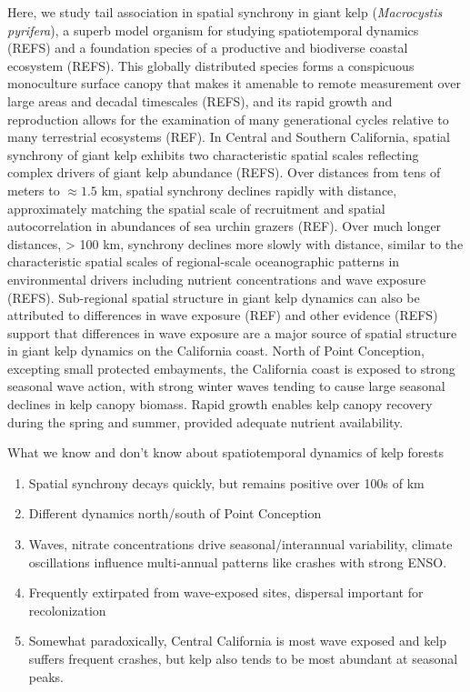 \documentclass[12pt, oneside]{article}
\begin{document}
Here, we study tail association in spatial synchrony in giant kelp (\textit{Macrocystis pyrifera}), a superb model organism for studying spatiotemporal dynamics (REFS) and a foundation species of a productive and biodiverse coastal ecosystem (REFS).
This globally distributed species forms a conspicuous monoculture surface canopy that makes it amenable to remote measurement over large areas and decadal timescales (REFS), and its rapid growth and reproduction allows for the examination of many generational cycles relative to many terrestrial ecosystems (REF). 
In Central and Southern California, spatial synchrony of giant kelp exhibits two characteristic spatial scales reflecting complex drivers of giant kelp abundance (REFS). Over distances from tens of meters to $\approx 1.5$ km, spatial synchrony declines rapidly with distance, approximately matching the spatial scale of recruitment and spatial autocorrelation in abundances of sea urchin grazers (REF). 
Over much longer distances, > 100 km, synchrony declines more slowly with distance, similar to the characteristic spatial scales of regional-scale oceanographic patterns in environmental drivers including nutrient concentrations and wave exposure (REFS).
Sub-regional spatial structure in giant kelp dynamics can also be attributed to differences in wave exposure (REF) and other evidence (REFS) support that differences in wave exposure are a major source of spatial structure in giant kelp dynamics on the California coast.
North of Point Conception, excepting small protected embayments, the California coast is exposed to strong seasonal wave action, with strong winter waves tending to cause large seasonal declines in kelp canopy biomass.
Rapid growth enables kelp canopy recovery during the spring and summer, provided adequate nutrient availability. 

\noindent What we know and don't know about spatiotemporal dynamics of kelp forests
\begin{enumerate}
\item{Spatial synchrony decays quickly, but remains positive over 100s of km}
\item{Different dynamics north/south of Point Conception}
\item{Waves, nitrate concentrations drive seasonal/interannual variability, climate oscillations influence multi-annual patterns like crashes with strong ENSO.}
\item{Frequently extirpated from wave-exposed sites, dispersal important for recolonization}
\item{Somewhat paradoxically, Central California is most wave exposed and kelp suffers frequent crashes, but kelp also tends to be most abundant at seasonal peaks.}
\end{enumerate}
\end{document}

